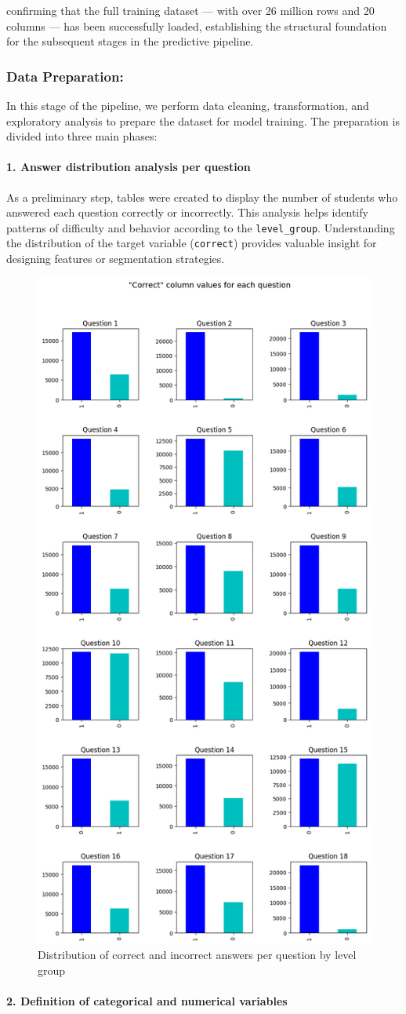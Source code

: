 \documentclass[12pt]{article}
\begin{document}
confirming that the full training dataset --- with over 26 million rows and 20 columns --- has been successfully loaded, establishing the structural foundation for the subsequent stages in the predictive pipeline.


    
\subsubsection{Data Preparation:}
In this stage of the pipeline, we perform data cleaning, transformation, and exploratory analysis to prepare the dataset for model training. The preparation is divided into three main phases:

\paragraph{1. Answer distribution analysis per question}

As a preliminary step, tables were created to display the number of students who answered each question correctly or incorrectly. This analysis helps identify patterns of difficulty and behavior according to the \texttt{level\_group}. Understanding the distribution of the target variable (\texttt{correct}) provides valuable insight for designing features or segmentation strategies.

\begin{figure}[H]
    \centering
    \includegraphics[width=0.3\linewidth]{src/PQR.png}
    \caption{Distribution of correct and incorrect answers per question by level group}
    \label{fig:answer-distribution}
\end{figure}

\paragraph{2. Definition of categorical and numerical variables}
\end{document}
